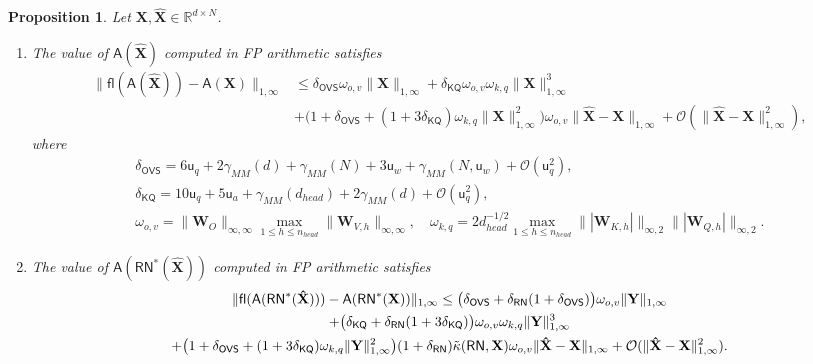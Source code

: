 \documentclass[namedate,webpdf,imanum]{ima-authoring-template}
\newcommand{\Real}{\mathbb{R}}
\newcommand{\Matrix}[1]{\mathbf{#1}}
\newcommand{\Norm}[3][]{#1\| #2 #1\|_{\mathrm{#3}}}
\newcommand{\Layer}[1]{\mathsf{#1}}
\newcommand{\fl}[2][]{\mathsf{fl}#1( #2 #1)}
\newcommand{\uh}{\mathsf{u}}
\newcommand{\Oh}[2][]{\mathcal{O}#1( #2 #1)}
\newtheorem{proposition}[theorem]{Proposition}%
\numberwithin{equation}{section}
\begin{document}
\begin{proposition}
\label{proposition:rounding-attn-block}
Let $\Matrix{X}, \Matrix{\hat{X}} \in \Real^{d \times N}$.
\begin{enumerate}
    \item The value of $\Layer{A}(\Matrix{\hat{X}})$ computed in FP arithmetic satisfies
    \begin{align*}
        \Norm{\fl{\Layer{A}(\Matrix{\hat{X}})} - \Layer{A}(\Matrix{X})}{1, \infty} &\leq \delta_{\Layer{OVS}} \omega_{o,v} \Norm{\Matrix{X}}{1,\infty} + \delta_{\Layer{KQ}} \omega_{o,v} \omega_{k,q} \Norm{\Matrix{X}}{1,\infty}^3 \\
        &+ \big( 1 + \delta_{\Layer{OVS}} + (1 + 3 \delta_{\Layer{KQ}}) \omega_{k,q} \Norm{\Matrix{X}}{1,\infty}^2 \big) \omega_{o,v} \Norm{\Matrix{\hat{X}} - \Matrix{X}}{1,\infty} + \Oh{\Norm{\Matrix{\hat{X}} - \Matrix{X}}{1,\infty}^2},
    \end{align*}
    where
    \begin{gather*}
        \delta_{\Layer{OVS}} = 6 \uh_{q} + 2\gamma_{MM}(d) + \gamma_{MM}(N) + 3 \uh_{w} + \gamma_{MM}(N, \uh_w) + \Oh{\uh_q^2}, \\
        \delta_{\Layer{KQ}} = 10 \uh_{q} + 5\uh_{a} + \gamma_{MM}(d_{head}) + 2\gamma_{MM}(d) + \Oh{\uh_q^2}, \\
        \omega_{o,v} = \Norm{\Matrix{W}_O}{\infty,\infty} \max_{1 \leq h \leq n_{head}} \Norm{\Matrix{W}_{V,h}}{\infty,\infty}, \quad \omega_{k,q} = 2 d_{head}^{-1/2} \max_{1 \leq h \leq n_{head}} \Norm{|\Matrix{W}_{K,h}|}{\infty,2} \Norm{|\Matrix{W}_{Q,h}|}{\infty,2}.
    \end{gather*}
    \item The value of $\Layer{A}(\Layer{RN}^*(\Matrix{\hat{X}}))$ computed in FP arithmetic satisfies
    \begin{multline*}
        \Norm{\fl{\Layer{A}(\Layer{RN}^*(\Matrix{\hat{X}}))} - \Layer{A}(\Layer{RN}^*(\Matrix{X}))}{1,\infty} \leq \big( \delta_{\Layer{OVS}} + \delta_{\Layer{RN}} (1 + \delta_{\Layer{OVS}}) \big) \omega_{o,v} \Norm{\Matrix{Y}}{1,\infty} \\
        + \big( \delta_{\Layer{KQ}} + \delta_{\Layer{RN}} (1 + 3\delta_{\Layer{KQ}}) \big) \omega_{o,v} \omega_{k,q} \Norm{\Matrix{Y}}{1,\infty}^3 \\
        + \big( 1 + \delta_{\Layer{OVS}} + (1 + 3 \delta_{\Layer{KQ}}) \omega_{k,q} \Norm{\Matrix{Y}}{1,\infty}^2 \big) (1 + \delta_{\Layer{RN}}) \Tilde{\kappa}(\Layer{RN},\Matrix{X}) \omega_{o,v} \Norm{\Matrix{\hat{X}} - \Matrix{X}}{1,\infty} + \Oh{\Norm{\Matrix{\hat{X}} - \Matrix{X}}{1,\infty}^2}.

\end{multline*}
\end{enumerate}
\end{proposition}
\end{document}
